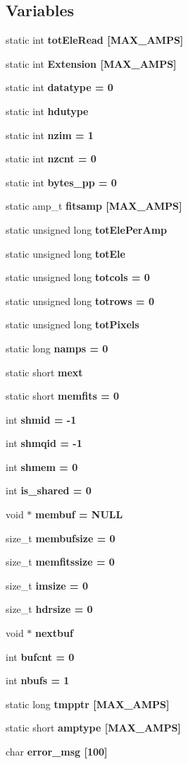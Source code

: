 \subsection*{Variables}
\begin{CompactItemize}
\item 
static int \bf{tot\-Ele\-Read} [MAX\_\-AMPS]
\item 
static int \bf{Extension} [MAX\_\-AMPS]
\item 
static int \bf{datatype} = 0
\item 
static int \bf{hdutype}
\item 
static int \bf{nzim} = 1
\item 
static int \bf{nzcnt} = 0
\item 
static int \bf{bytes\_\-pp} = 0
\item 
static amp\_\-t \bf{fitsamp} [MAX\_\-AMPS]
\item 
static unsigned long \bf{tot\-Ele\-Per\-Amp}
\item 
static unsigned long \bf{tot\-Ele}
\item 
static unsigned long \bf{totcols} = 0
\item 
static unsigned long \bf{totrows} = 0
\item 
static unsigned long \bf{tot\-Pixels}
\item 
static long \bf{namps} = 0
\item 
static short \bf{mext}
\item 
static short \bf{memfits} = 0
\item 
int \bf{shmid} = -1
\item 
int \bf{shmqid} = -1
\item 
int \bf{shmem} = 0
\item 
int \bf{is\_\-shared} = 0
\item 
void $\ast$ \bf{membuf} = NULL
\item 
size\_\-t \bf{membufsize} = 0
\item 
size\_\-t \bf{memfitssize} = 0
\item 
size\_\-t \bf{imsize} = 0
\item 
size\_\-t \bf{hdrsize} = 0
\item 
void $\ast$ \bf{nextbuf}
\item 
int \bf{bufcnt} = 0
\item 
int \bf{nbufs} = 1
\item 
static long \bf{tmpptr} [MAX\_\-AMPS]
\item 
static short \bf{amptype} [MAX\_\-AMPS]
\item 
char \bf{error\_\-msg} [100]
\end{CompactItemize}


